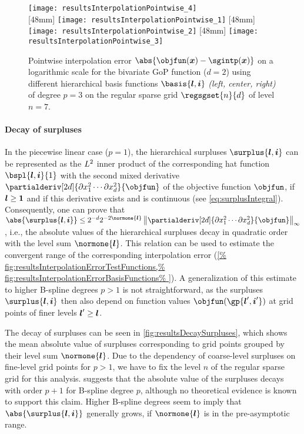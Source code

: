 \begin{figure}
  \texttt{[image: resultsInterpolationPointwise\_4]}\\[2mm]%
  [48mm]{%
    \texttt{[image: resultsInterpolationPointwise\_1]}%
  }%
  \hfill%
  [48mm]{%
    \texttt{[image: resultsInterpolationPointwise\_2]}%
  }%
  \hfill%
  [48mm]{%
    \texttt{[image: resultsInterpolationPointwise\_3]}%
  }%
  \caption[Pointwise interpolation error]{%
    Pointwise interpolation error
    $\abs{\objfun(\*x) - \sgintp(\*x)}$ on a logarithmic scale
    for the bivariate GoP function ($d = 2$)
    using different hierarchical basis functions
    $\basis{\*l,\*i}$ \emph{(left, center, right)} of degree $p = 3$ on
    the regular sparse grid $\regsgset{n}{d}$ of level $n = 7$.%
  }%
  \label{fig:resultsInterpolationErrorPointwise}%
\end{figure}

\paragraph{Decay of surpluses}

In the piecewise linear case ($p = 1$),
the hierarchical surpluses $\surplus{\*l,\*i}$
can be represented as the $L^2$ inner product of
the corresponding hat function $\bspl{\*l,\*i}{1}$ with the
second mixed derivative
$\partialderiv[2d]{\partialdiff x_1^2 \dotsm \partialdiff x_d^2}{\objfun}$
of the objective function $\objfun$,
if ${\boldsymbol{l}} \ge {\boldsymbol{1}}$ and if this derivative exists and is continuous
(see \cref{eq:surplusIntegral}).
Consequently, one can prove that
$\abs{\surplus{\*l,\*i}} \le 2^{-d} 2^{-2\normone{\*l}}
\normscaled[\infty]{
  \partialderiv[2d]{\partialdiff x_1^2 \dotsm \partialdiff x_d^2}{\objfun}
}$ \cite{Bungartz04Sparse},
i.e., the absolute values of the hierarchical surpluses
decay  in quadratic order with the level sum $\normone{\*l}$.
This relation can be used to estimate the convergent range
of the corresponding interpolation error (\cref{%
  fig:resultsInterpolationErrorTestFunctions,%
  fig:resultsInterpolationErrorBasisFunctions%
}).
A generalization of this estimate to higher B-spline degrees $p > 1$
is not straightforward, as the surpluses $\surplus{\*l,\*i}$
then also depend on function values $\objfun(\gp{\*l',\*i'})$ at
grid points of finer levels ${\boldsymbol{l}}' \ge {\boldsymbol{l}}$.

The decay of surpluses can be seen in \cref{fig:resultsDecaySurpluses},
which shows the mean absolute value of surpluses corresponding to
grid points grouped by their level sum $\normone{\*l}$.
Due to the dependency of coarse-level surpluses on fine-level grid points
for $p > 1$,
we have to fix the level $n$ of the regular sparse grid for this analysis.
 suggests that the
absolute value of the surpluses decays with order $p + 1$ for
B-spline degree $p$, although no theoretical evidence
is known to support this claim.
Higher B-spline degrees seem to imply that
$\abs{\surplus{\*l,\*i}}$ generally grows, if $\normone{\*l}$ is
in the pre-asymptotic range.

